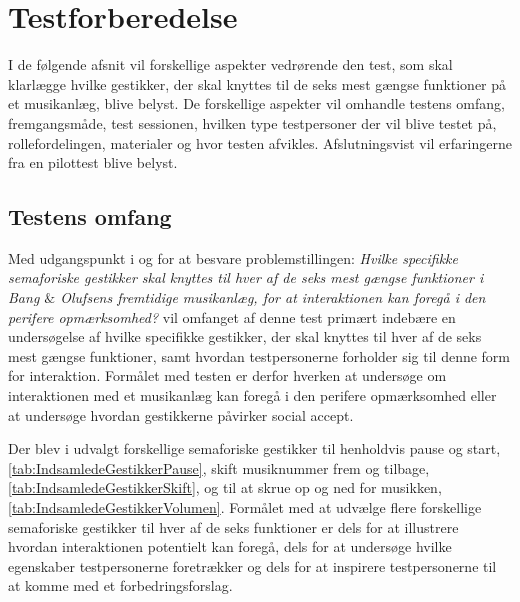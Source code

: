 \section{Testforberedelse}
\label{Testforberedelse}
%
I de følgende afsnit vil forskellige aspekter vedrørende den test, som skal klarlægge hvilke gestikker, der skal knyttes til de seks mest gængse funktioner på et musikanlæg, blive belyst. De forskellige aspekter vil omhandle testens omfang, fremgangsmåde, test sessionen, hvilken type testpersoner der vil blive testet på, rollefordelingen, materialer og hvor testen afvikles. Afslutningsvist vil erfaringerne fra en pilottest blive belyst.   
%

\subsection{Testens omfang}
\label{TestensOmfangValgAfGestikker}
%
Med udgangspunkt i og for at besvare problemstillingen: \textit{Hvilke specifikke semaforiske gestikker skal knyttes til hver af de seks mest gængse funktioner i Bang $\&$ Olufsens fremtidige musikanlæg, for at interaktionen kan foregå i den perifere opmærksomhed?} vil omfanget af denne test primært indebære en undersøgelse af hvilke specifikke gestikker, der skal knyttes til hver af de seks mest gængse funktioner, samt hvordan testpersonerne forholder sig til denne form for interaktion. Formålet med testen er derfor hverken at undersøge om interaktionen med et musikanlæg kan foregå i den perifere opmærksomhed eller at undersøge hvordan gestikkerne påvirker social accept. 

Der blev i  udvalgt forskellige semaforiske gestikker til henholdvis pause og start, \autoref{tab:IndsamledeGestikkerPause}, skift musiknummer frem og tilbage, \autoref{tab:IndsamledeGestikkerSkift}, og til at skrue op og ned for musikken, \autoref{tab:IndsamledeGestikkerVolumen}. Formålet med at udvælge flere forskellige semaforiske gestikker til hver af de seks funktioner er dels for at illustrere hvordan interaktionen potentielt kan foregå, dels for at undersøge hvilke egenskaber testpersonerne foretrækker og dels for at inspirere testpersonerne til at komme med et forbedringsforslag. 
%

